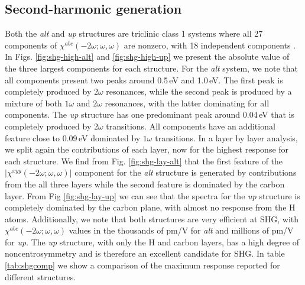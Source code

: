 \documentclass[pss]{wiley2sp} %
\begin{document}
\subsection{Second-harmonic generation}
Both the \emph{alt} and \emph{up} structures are triclinic class 1 systems
where all 27 components of $\chi^{abc}(-2\omega;\omega,\omega)$ are nonzero,
with 18 independent components \cite{popovbook}. In Figs. 
\ref{fig:shg-high-alt} and \ref{fig:shg-high-up} we present the absolute value
of the three largest components for each structure. For the \emph{alt} system,
we note that all components present two peaks around 0.5\,eV and 1.0\,eV. The
first peak is completely produced by $2\omega$ resonances, while the second
peak is produced by a mixture of both $1\omega$ and $2\omega$ resonances, with
the latter dominating for all components. The \emph{up} structure  has one
predominant peak around 0.04\,eV that is completely produced by $2\omega$
transitions. All components have an additional feature close to 0.09\,eV
dominated by $1\omega$ transitions. In a layer by layer analysis, we split again the contributions of each layer, now for the highest response for each structure.
We find from Fig. \ref{fig:shg-lay-alt} that the first feature of the $|\chi^{xyy}(-2\omega;\omega,\omega)|$ component for the \emph{alt} structure is generated by contributions from the all three layers while the second feature is dominated by the carbon layer. From Fig \ref{fig:shg-lay-up} we can see that the spectra for the \emph{up} structure is completely dominated by the
carbon plane, with almost no response from the H atoms. Additionally, we note
that both structures are very efficient at SHG, with
$\chi^{abc}(-2\omega;\omega,\omega)$ values in the thousands of pm/V for
\emph{alt} and millions of pm/V for \emph{up}. The \emph{up} structure, with
only the H and carbon layers, has a high degree of noncentrosymmetry and is
therefore an excellent candidate for SHG. In table \ref{tab:shgcomp} we show a
comparison of the maximum response reported for different structures.
\end{document}
